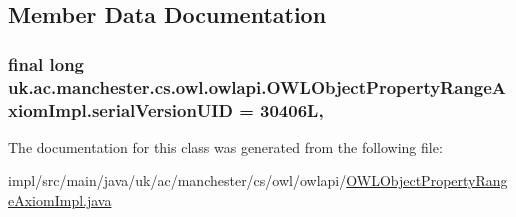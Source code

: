 \subsection{Member Data Documentation}
\hypertarget{classuk_1_1ac_1_1manchester_1_1cs_1_1owl_1_1owlapi_1_1_o_w_l_object_property_range_axiom_impl_abf1f9ee50989084f1e7857c491e82fc1}{
\subsubsection[{serial\-Version\-U\-I\-D}]{\setlength{\rightskip}{0pt plus 5cm}final long uk.\-ac.\-manchester.\-cs.\-owl.\-owlapi.\-O\-W\-L\-Object\-Property\-Range\-Axiom\-Impl.\-serial\-Version\-U\-I\-D = 30406\-L\hspace{0.3cm}{\ttfamily [static]}, {\ttfamily [private]}}}\label{classuk_1_1ac_1_1manchester_1_1cs_1_1owl_1_1owlapi_1_1_o_w_l_object_property_range_axiom_impl_abf1f9ee50989084f1e7857c491e82fc1}


The documentation for this class was generated from the following file\-:\begin{DoxyCompactItemize}
\item 
impl/src/main/java/uk/ac/manchester/cs/owl/owlapi/\hyperlink{_o_w_l_object_property_range_axiom_impl_8java}{O\-W\-L\-Object\-Property\-Range\-Axiom\-Impl.\-java}\end{DoxyCompactItemize}

